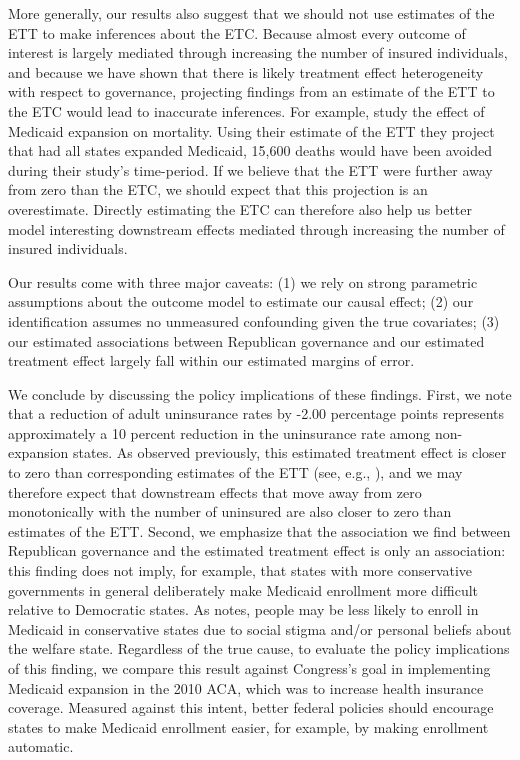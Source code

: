 \documentclass[aoas]{imsart}
\theoremstyle{plain}
\theoremstyle{remark}
\begin{document}
More generally, our results also suggest that we should not use estimates of the ETT to make inferences about the ETC. Because almost every outcome of interest is largely mediated through increasing the number of insured individuals, and because we have shown that there is likely treatment effect heterogeneity with respect to governance, projecting findings from an estimate of the ETT to the ETC would lead to inaccurate inferences. For example, \cite{miller2019medicaid} study the effect of Medicaid expansion on mortality. Using their estimate of the ETT they project that had all states expanded Medicaid, 15,600 deaths would have been avoided during their study's time-period. If we believe that the ETT were further away from zero than the ETC, we should expect that this projection is an overestimate. Directly estimating the ETC can therefore also help us better model interesting downstream effects mediated through increasing the number of insured individuals. 

Our results come with three major caveats: (1) we rely on strong parametric assumptions about the outcome model to estimate our causal effect; (2) our identification assumes no unmeasured confounding given the true covariates; (3) our estimated associations between Republican governance and our estimated treatment effect largely fall within our estimated margins of error. 

We conclude by discussing the policy implications of these findings. First, we note that a reduction of adult uninsurance rates by -2.00 percentage points represents approximately a 10 percent reduction in the uninsurance rate among non-expansion states. As observed previously, this estimated treatment effect is closer to zero than corresponding estimates of the ETT (see, e.g., \cite{courtemanche2017early}), and we may therefore expect that downstream effects that move away from zero monotonically with the number of uninsured are also closer to zero than estimates of the ETT. Second, we emphasize that the association we find between Republican governance and the estimated treatment effect is only an association: this finding does not imply, for example, that states with more conservative governments in general deliberately make Medicaid enrollment more difficult relative to Democratic states. As \cite{sommers2012understanding} notes, people may be less likely to enroll in Medicaid in conservative states due to social stigma and/or personal beliefs about the welfare state. Regardless of the true cause, to evaluate the policy implications of this finding, we compare this result against Congress's goal in implementing Medicaid expansion in the 2010 ACA, which was to increase health insurance coverage. Measured against this intent, better federal policies should encourage states to make Medicaid enrollment easier, for example, by making enrollment automatic. 
\end{document}
